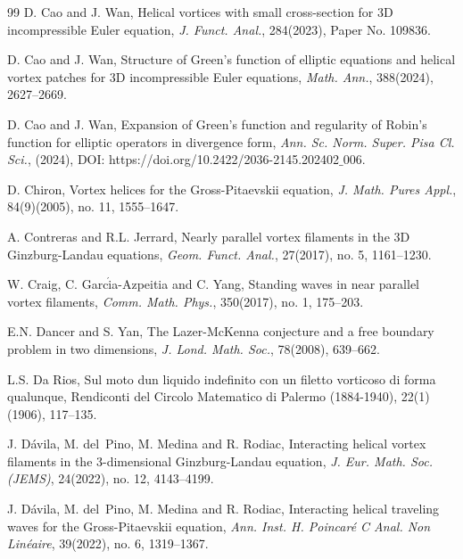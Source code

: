 \documentclass[12pt,reqno]{amsart}
\numberwithin{equation}{section}
\theoremstyle{definition}
\theoremstyle{remark}
\begin{document}
\begin{thebibliography}{99}
D. Cao and J. Wan, Helical vortices with small cross-section for 3D incompressible Euler equation, \textit{J. Funct. Anal.}, 284(2023), Paper No. 109836.

D. Cao and J. Wan, Structure of Green's function of elliptic equations and helical vortex patches for 3D incompressible Euler equations, \textit{Math. Ann.},
 388(2024),  2627--2669.



D. Cao and J. Wan, Expansion of Green’s function and regularity of Robin’s function for elliptic operators in divergence form,   \textit{Ann. Sc. Norm. Super. Pisa
Cl. Sci.}, (2024), DOI: https://doi.org/10.2422/2036-2145.202402$ \_ $006.

D. Chiron, Vortex helices for the Gross-Pitaevskii equation, \textit{J. Math. Pures Appl.}, 84(9)(2005), no. 11, 1555--1647.

A. Contreras and R.L. Jerrard, Nearly parallel vortex filaments in the 3D Ginzburg-Landau equations, \textit{Geom. Funct. Anal.}, 27(2017), no. 5, 1161--1230.

W. Craig, C. Garc$\acute{\text{i}}$a-Azpeitia  and C. Yang, Standing waves in near parallel vortex filaments, \textit{Comm. Math. Phys.}, 350(2017), no. 1, 175--203.


E.N. Dancer and S. Yan, The Lazer-McKenna conjecture and a free boundary problem
in two dimensions, \textit{J. Lond. Math. Soc.}, 78(2008), 639--662.

L.S. Da Rios, Sul moto dun liquido indefinito con un filetto vorticoso di forma qualunque, Rendiconti del Circolo Matematico di Palermo (1884-1940), 22(1)(1906), 117--135.


J. D\'avila, M. del~Pino, M. Medina  and R. Rodiac,  Interacting helical
vortex filaments in the 3-dimensional Ginzburg-Landau equation, \textit{J. Eur. Math. Soc. (JEMS)},  24(2022), no. 12, 4143--4199.  %

J. D\'avila, M. del~Pino, M. Medina  and R. Rodiac,   Interacting helical traveling waves for the Gross-Pitaevskii equation,
\textit{Ann. Inst. H. Poincar\'e C Anal. Non Lin\'eaire},  39(2022), no. 6, 1319--1367. %


\end{thebibliography}
\end{document}
